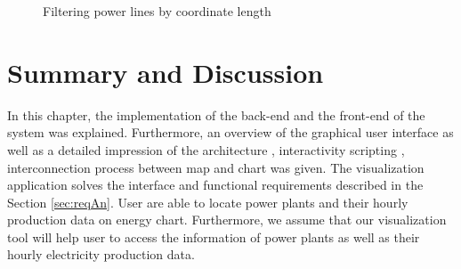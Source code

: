 \begin{figure}
  \begin{center}
\hfill
{}
\hfill
\caption{Filtering power lines by coordinate length}
\label{fig:plfilter}
\end{center}
\end{figure}

\section{Summary and Discussion}

In this chapter, the implementation of the back-end and the front-end of the system was explained.
Furthermore, an overview of the graphical user interface as well as a detailed impression of
the architecture , interactivity scripting , interconnection process between map and chart was given. The visualization application solves the interface and functional requirements described in the Section \ref{sec:reqAn}. User are able to locate power plants and their hourly production data on energy chart. Furthermore, we assume that our visualization tool will help user to access the information of power plants as well as their hourly electricity production data. 

